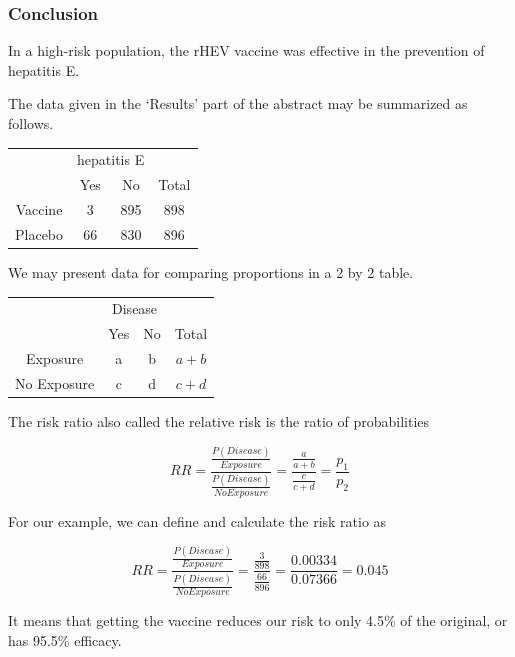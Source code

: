 \documentclass[11pt, chapterprefix=true]{scrbook}\usepackage[]{graphicx}\usepackage[]{color}
\begin{document}
\subsubsection{Conclusion}

In a high-risk population, the rHEV vaccine was effective in the prevention of
hepatitis E.

The data given in the `Results' part of the abstract may be summarized as follows.

\begin{table}[ht]
\centering
\begin{tabular}{@{} cccc @{}} \hline
 & \multicolumn{2}{c}{hepatitis E} \\
 & Yes & No & Total \\ \hline
 Vaccine & 3 & 895 & 898 \\
 Placebo  & 66 & 830 & 896 \\ \hline
 \end{tabular}
 \end{table}

We may present data for comparing proportions in a 2 by 2 table.

\begin{table}[ht]
\centering
\begin{tabular}{@{} cccc @{}} \hline
 & \multicolumn{2}{c}{Disease} \\
 & Yes & No & Total \\ \hline
 Exposure & a & b & $a + b$ \\
 No Exposure  & c & d & $c + d$ \\ \hline
 \end{tabular}
 \end{table}

The risk ratio also called the relative risk is the ratio of probabilities

\begin{equation*}
  RR = \frac{ \frac{P(Disease)}{Exposure}}{ \frac{P(Disease)}{No Exposure} } = \frac{ \frac{a}{a + b}}{ \frac{c}{c + d} } = \frac{p_1}{p_2}
\end{equation*}

For our example, we can define and calculate the risk ratio as

\begin{equation*}
  RR = \frac{ \frac{P(Disease)}{Exposure}}{ \frac{P(Disease)}{No Exposure} } = \frac{ \frac{3}{898}}{ \frac{66}{896} } = \frac{0.00334}{0.07366} = 0.045
\end{equation*}

It means that getting the vaccine reduces our risk to only 4.5\% of the original, or has 95.5\% efficacy.
\end{document}
